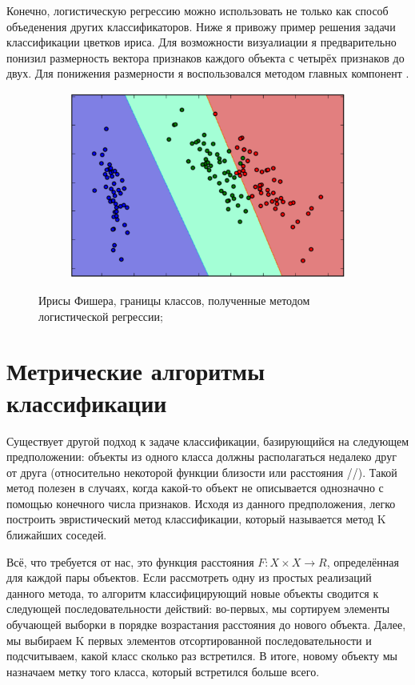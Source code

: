 Конечно, логистическую регрессию можно использовать не только как способ объеденения других классификаторов. Ниже я привожу пример решения задачи классификации цветков ириса. Для возможности визуалиации  я предварительно понизил размерность вектора признаков каждого объекта с четырёх признаков до двух. Для понижения размерности я воспользовался методом главных компонент \cite{pca_book}\cite{pca_program}.

\begin{figure}[ht]
	\centering
    \begin{subfigure}[b]{1\textwidth}
    \centering
        \includegraphics[scale=0.5]{pasted-image-19.png}        
    \end{subfigure}
 
    \caption{Ирисы Фишера, границы классов, полученные методом логистической регрессии;}
    \label{fig_parsetree}
\end{figure}

\section{Метрические алгоритмы классификации}

Существует другой подход к задаче классификации, базирующийся на следующем предположении: объекты из одного класса должны располагаться недалеко друг от друга (относительно некоторой функции близости или расстояния //). Такой метод полезен в случаях, когда какой-то объект не описывается однозначно с помощью конечного числа признаков. Исходя из данного предположения, легко построить эвристический метод классификации, который называется метод K ближайших соседей.

Всё, что требуется от нас, это функция расстояния $F : X \times X \to R$, определённая для каждой пары объектов. Если рассмотреть одну из простых реализаций данного метода, то алгоритм классифицирующий новые объекты сводится к следующей последовательности действий: во-первых, мы сортируем элементы обучающей выборки в порядке возрастания  расстояния до нового объекта. Далее, мы выбираем K первых элементов отсортированной последовательности и подсчитываем, какой класс сколько раз встретился. В итоге, новому объекту мы назначаем метку того класса, который встретился больше всего.

